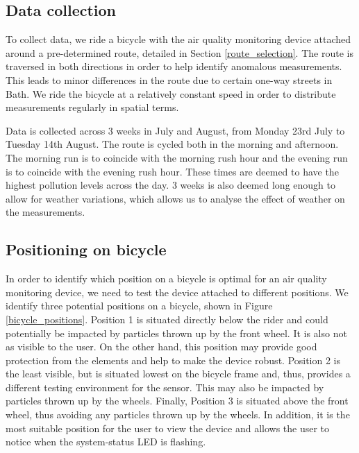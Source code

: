 \documentclass[11pt]{report}
\begin{document}
\subsection{Data collection}

To collect data, we ride a bicycle with the air quality monitoring device attached around a pre-determined route, detailed in Section \ref{route_selection}. The route is traversed in both directions in order to help identify anomalous measurements. This leads to minor differences in the route due to certain one-way streets in Bath. We ride the bicycle at a relatively constant speed in order to distribute measurements regularly in spatial terms.

Data is collected across 3 weeks in July and August, from Monday 23rd July to Tuesday 14th August. The route is cycled both in the morning and afternoon. The morning run is to coincide with the morning rush hour and the evening run is to coincide with the evening rush hour. These times are deemed to have the highest pollution levels across the day. 3 weeks is also deemed long enough to allow for weather variations, which allows us to analyse the effect of weather on the measurements.

\subsection{Positioning on bicycle} \label{position_testing}

In order to identify which position on a bicycle is optimal for an air quality monitoring device, we need to test the device attached to different positions. We identify three potential positions on a bicycle, shown in Figure \ref{bicycle_positions}. Position 1 is situated directly below the rider and could potentially be impacted by particles thrown up by the front wheel. It is also not as visible to the user. On the other hand, this position may provide good protection from the elements and help to make the device robust. Position 2 is the least visible, but is situated lowest on the bicycle frame and, thus, provides a different testing environment for the sensor. This may also be impacted by particles thrown up by the wheels. Finally, Position 3 is situated above the front wheel, thus avoiding any particles thrown up by the wheels. In addition, it is the most suitable position for the user to view the device and allows the user to notice when the system-status LED is flashing. 
\end{document}
